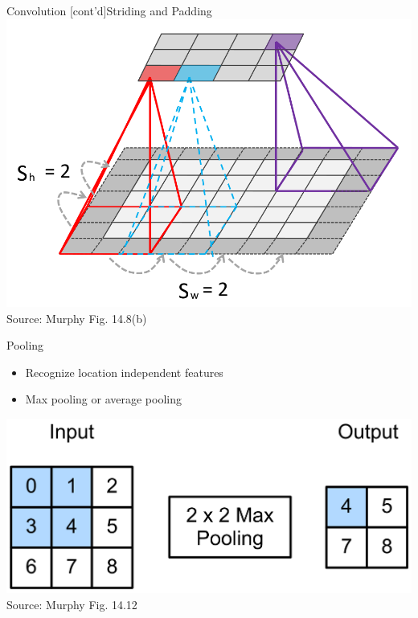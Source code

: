 \documentclass[ignorenonframetext,xcolor=x11names]{beamer}
\begin{document}
\begin{frame}{Convolution \small [cont'd]}{Striding and Padding}
\centering
\includegraphics[width=.8\textwidth]{screen4.png} \\

\scriptsize Source: Murphy Fig. 14.8(b)
\end{frame}

\begin{frame}{Pooling}
\begin{itemize}
   \item Recognize location independent features
   \item Max pooling or average pooling
\end{itemize}
\centering
\includegraphics[width=.8\textwidth]{screen5.png} \\

\scriptsize Source: Murphy Fig. 14.12
\end{frame}
\end{document}
